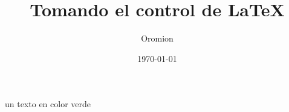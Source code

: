 \documentclass{article}
\title{Tomando el control de \LaTeX}
\author{Oromion}
\date{\today}
\begin{document}
\maketitle

\textcolor{myGreen}{un texto en color verde}
\end{document}
